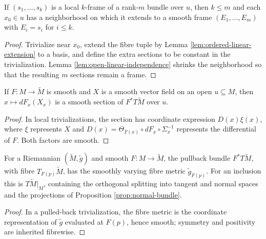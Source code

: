\begin{lemma}
\label{lem:partial-frame-extension}





If $(s_1,\ldots,s_k)$ is a local $k$-frame of a rank-$m$ bundle over $u$, then $k\le m$ and each $x_0\in u$ has a neighborhood on which it extends to a smooth frame $(E_1,\ldots,E_m)$ with $E_i=s_i$ for $i\le k$.
\end{lemma}
\begin{proof}

\sketch Trivialize near $x_0$, extend the fibre tuple by Lemma \ref{lem:ordered-linear-extension} to a basis, and define the extra sections to be constant in the trivialization. Lemma \ref{lem:open-linear-independence} shrinks the neighborhood so that the resulting $m$ sections remain a frame.
\end{proof}

\begin{lemma}
\label{lem:pushforward-smooth}





If $F:M\to\widetilde M$ is smooth and $X$ is a smooth vector field on an open $u\subseteq M$, then $x\mapsto dF_x(X_x)$ is a smooth section of $F^*T\widetilde M$ over $u$.
\end{lemma}
\begin{proof}

\sketch In local trivializations, the section has coordinate expression $D(x)\xi(x)$, where $\xi$ represents $X$ and $D(x)=\Theta_{F(x)}\circ dF_x\circ\Sigma_x^{-1}$ represents the differential of $F$. Both factors are smooth.
\end{proof}

\begin{lemma}
\label{lem:ambient-tangent-bundle-riemannian}





For a Riemannian $(\widetilde M,\widetilde g)$ and smooth $F:M\to\widetilde M$, the pullback bundle $F^*T\widetilde M$, with fibre $T_{F(p)}\widetilde M$, has the smoothly varying fibre metric $\widetilde g_{F(p)}$. For an inclusion this is $T\widetilde M|_M$, containing the orthogonal splitting into tangent and normal spaces and the projections of Proposition \ref{prop:normal-bundle}.
\end{lemma}
\begin{proof}

\sketch In a pulled-back trivialization, the fibre metric is the coordinate representation of $\widetilde g$ evaluated at $F(p)$, hence smooth; symmetry and positivity are inherited fibrewise.
\end{proof}


